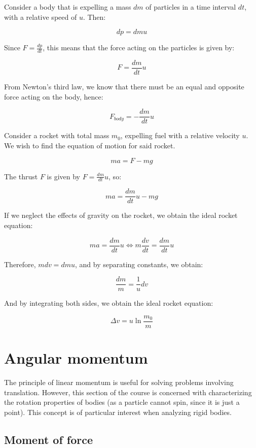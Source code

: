\documentclass[12pt]{article}
\begin{document}
Consider a body that is expelling a mass $dm$ of particles in a time interval $dt$, with a relative speed of $u$. Then:

\[ dp = dm u \]

Since $F = \frac{dp}{dt}$, this means that the force acting on the particles is given by:

\[ F = \frac{dm}{dt}u \]

From Newton's third law, we know that there must be an equal and opposite force acting on the body, hence:

\[ F_{body} = - \frac{dm}{dt}u \]

\begin{example}
    Consider a rocket with total mass $m_0$, expelling fuel with a relative velocity $u$. We wish to find the equation of motion for said rocket.

    \[ ma = F - mg \]

    The thrust $F$ is given by $F = \frac{dm}{dt}u$, so:

    \[ ma = \frac{dm}{dt}u - mg \]

    If we neglect the effects of gravity on the rocket, we obtain the ideal rocket equation:

    \[ ma = \frac{dm}{dt}u \iff m\frac{dv}{dt} = \frac{dm}{dt}u \]

    Therefore, $mdv = dmu$, and by separating constants, we obtain:

    \[ \frac{dm}{m} = \frac{1}{u}dv \]

    And by integrating both sides, we obtain the ideal rocket equation:

    \[ \Delta v = u\ln{\frac{m_0}{m}} \]
\end{example}

\newpage

\section{Angular momentum}

The principle of linear momentum is useful for solving problems involving translation. However, this section of the course is concerned with characterizing the rotation properties of bodies (as a particle cannot spin, since it is just a point). This concept is of particular interest when analyzing rigid bodies.

\subsection{Moment of force}
\end{document}
